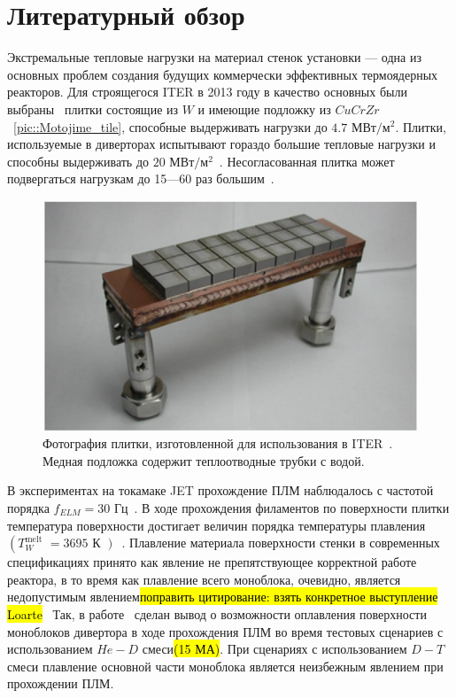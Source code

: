 \section{Литературный обзор}

Экстремальные тепловые нагрузки на материал стенок установки --- одна из
основных проблем создания будущих коммерчески эффективных термоядерных
реакторов. Для строящегося ITER в 2013 году в качество основных были
выбраны~\cite{merola2015engineering} плитки состоящие из $W$ и имеющие подложку
из $CuCrZr$~\autoref{pic::Motojime_tile}, способные выдерживать нагрузки до $4.7$ МВт$/$м$^2$. Плитки,
используемые в диверторах испытывают гораздо большие тепловые нагрузки и
способны выдерживать до $20$ МВт$/$м$^2$~\cite{motojima2015iter}.
Несогласованная плитка может подвергаться нагрузкам до 15---60 раз
большим~\cite{moritz2023thermionic}. 

\begin{figure}[H]
	\centering
	\includegraphics[width=0.7\linewidth]{material/Motojima_tile.png}
    \caption{Фотография плитки, изготовленной для использования в
    ITER~\cite{motojima2015iter}. Медная подложка содержит теплоотводные трубки с
водой.}
	\label{pic::Motojime_tile}
\end{figure}

В экспериментах на токамаке JET прохождение ПЛМ наблюдалось с частотой порядка
$f_{ELM} = 30$ Гц~\cite{coenen2015elm}. 
В ходе прохождения филаментов по поверхности плитки температура поверхности
достигает величин порядка температуры плавления$\left(T_W^{\text{melt}}\right.$ 
$\left.= 3695\text{ К }\right)$~\cite{coenen2015elm}. 
Плавление материала поверхности стенки в современных спецификациях принято как
явление не препятствующее корректной работе реактора, в то время как плавление
всего моноблока, очевидно, является недопустимым явлением\hl{поправить
цитирование: взять конкретное выступление Loarte}~\cite{soukhanovskii23rd}
Так, в работе~\cite{gunn2017surface} сделан вывод о возможности оплавления
поверхности моноблоков дивертора в ходе прохождения ПЛМ во время тестовых сценариев с
использованием $He-D$ смеси\hl{(15 МА)}. При сценариях с использованием $D-T$ смеси
плавление основной части моноблока является неизбежным явлением при прохождении
ПЛМ.


